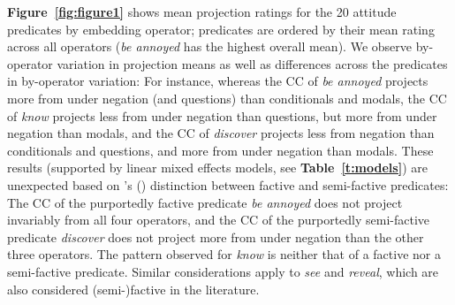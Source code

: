 \documentclass[12pt, letterpaper]{article}
\newcommand{\posscite}[1]{\citeauthor{#1}'s (\citeyear{#1})}
\begin{document}
	\textbf{Figure~\ref{fig:figure1}} shows mean projection ratings for the 20 attitude predicates by embedding operator; predicates are ordered by their mean rating across all operators (\emph{be annoyed} has the highest overall mean). We observe by-operator variation in projection means as well as differences across the predicates in by-operator variation: For instance, whereas the CC of \emph{be annoyed} projects more from under negation (and questions) than conditionals and modals, the CC of \emph{know} projects less from under negation than questions, but more from under negation than modals, and the CC of \emph{discover} projects less from negation than conditionals and questions, and more from under negation than modals.
	These results (supported by linear mixed effects models, see \textbf{Table~\ref{t:models}}) are unexpected 
	based on \posscite{karttunen_observations_1971} distinction between factive and semi-factive predicates: The CC of the purportedly factive predicate \emph{be annoyed} does not project invariably from all four operators, and the CC of the purportedly semi-factive predicate \emph{discover} does not project more from under negation than the other three operators. The pattern observed for {\em know} is neither that of a factive nor a semi-factive predicate. Similar considerations apply to \emph{see} and \emph{reveal}, which are also considered (semi-)factive in the literature.

\end{document}
